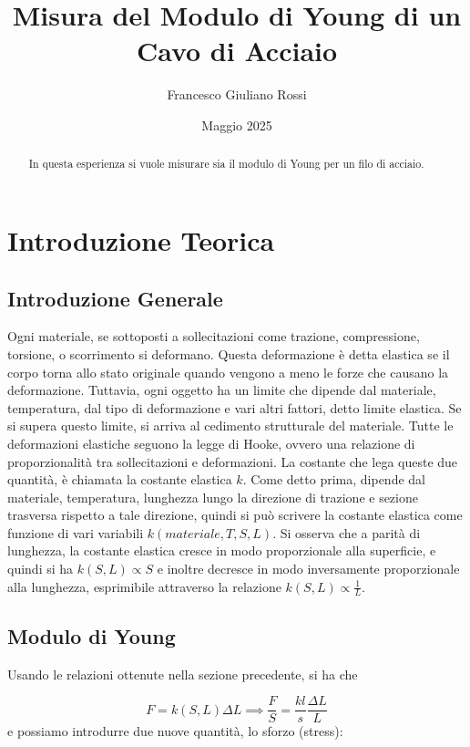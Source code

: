 \documentclass[a4paper]{article}
\title{Misura del Modulo di Young di un Cavo di Acciaio}
\author{Francesco Giuliano Rossi}
\date{Maggio 2025}
\begin{document}
\maketitle
\tableofcontents

\begin{abstract}
    In questa esperienza si vuole misurare sia il modulo di Young per un filo di acciaio. 
\end{abstract}

\section{Introduzione Teorica}
\subsection{Introduzione Generale}
Ogni materiale, se sottoposti a sollecitazioni come trazione, compressione, torsione, o scorrimento si deformano. Questa deformazione è detta elastica se il corpo torna allo stato originale quando vengono a meno le forze che causano la deformazione. Tuttavia, ogni oggetto ha un limite che dipende dal materiale, temperatura, dal tipo di deformazione e vari altri fattori, detto limite elastica. Se si supera questo limite, si arriva al cedimento strutturale del materiale. Tutte le deformazioni elastiche seguono la legge di Hooke, ovvero una relazione di proporzionalità tra sollecitazioni e deformazioni. La costante che lega queste due quantità, è chiamata la costante elastica $k$. Come detto prima, dipende dal materiale, temperatura, lunghezza lungo la direzione di trazione e sezione trasversa rispetto a tale direzione, quindi si può scrivere la costante elastica come funzione di vari variabili $k(materiale,T,S,L)$. Si osserva che a parità di lunghezza, la costante elastica cresce in modo proporzionale alla superficie, e quindi si ha $k(S,L)\propto S$ e inoltre decresce in modo inversamente proporzionale alla lunghezza, esprimibile attraverso la relazione $k(S,L)\propto \frac{1}{L}$. 

\subsection{Modulo di Young}
Usando le relazioni ottenute nella sezione precedente, si ha che

\begin{equation}
    F=k(S,L)\Delta L \implies \frac{F}{S} = \frac{kl}{s} \frac{\Delta L}{L}
\end{equation}
e possiamo introdurre due nuove quantità, lo sforzo (stress): 
\end{document}
